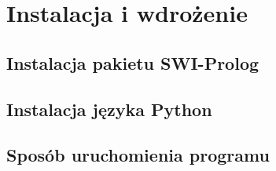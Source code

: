 \chapter{Instalacja i wdrożenie}
\thispagestyle{chapterBeginStyle}

\section{Instalacja pakietu SWI-Prolog}

\section{Instalacja języka Python}

\section{Sposób uruchomienia programu}
